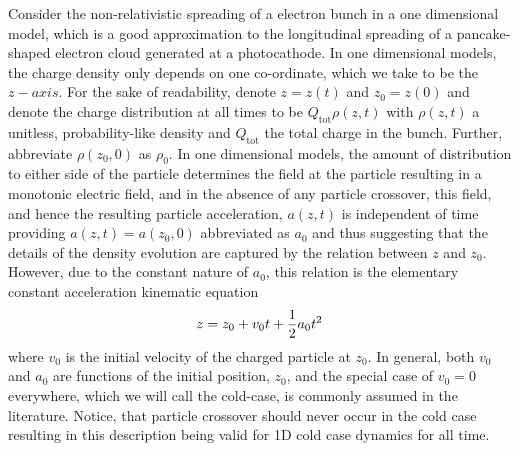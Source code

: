 \documentclass[aps,prl,twocolumn,showpacs,superscriptaddress,groupedaddress]{revtex4-1}  %
\begin{document}
{Consider 
the non-relativistic spreading of a electron bunch in a one dimensional model, which is a good approximation 
to the longitudinal spreading of a pancake-shaped electron cloud generated at a photocathode. 
In one dimensional models, the charge density only depends on 
one co-ordinate, which we take to be the $z-axis$.  For the sake of readability,
denote $z = z(t)$ and $z_0 = z(0)$ and denote the charge distribution at all times to
be $Q_\text{tot} \rho(z,t)$ with $\rho(z,t)$ 
a unitless, probability-like density and  
$Q_\text{tot}$  the total charge in the bunch.  Further, abbreviate $\rho(z_0,0)$ as $\rho_0$.
In one dimensional models, the amount of distribution to either side of the particle 
determines the field at the particle resulting in a monotonic electric field, and in the absence of any particle crossover, this field, and hence the resulting
particle acceleration, $a(z,t)$ is independent of time providing
$a(z,t) = a(z_0,0)$ abbreviated as $a_0$ and thus suggesting that
the details of the density evolution are captured by the relation between
$z$ and $z_0$.
However, due to the constant nature of $a_0$, this 
relation is the elementary constant acceleration kinematic equation
\begin{equation}\label{eq:non-relativistic position}
  z = z_0 + v_0 t + {1\over 2} a_0 t^2
\end{equation}
where $v_0$ is the initial velocity of the charged particle at $z_0$.  In general,
both $v_0$ and $a_0$ are functions of the initial position, $z_0$, and the special case of $v_0 = 0$ everywhere, which we will call the cold-case,
is commonly assumed in the literature.  Notice, that particle crossover should never occur in the cold case resulting in this description being valid
for 1D cold case dynamics for all time. 

}
\end{document}
